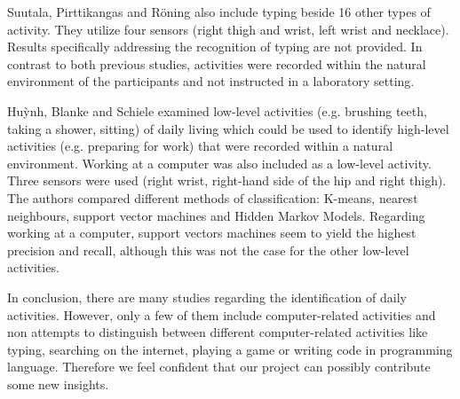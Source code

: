 \documentclass[11pt,a4paper]{paper}
\begin{document}
Suutala, Pirttikangas and Röning \cite{suutalaetal2007} also 
 include typing beside 16 other types of activity. 
They utilize four sensors (right thigh and wrist, left wrist and necklace).
Results specifically addressing the recognition of typing are not provided.
In contrast to both previous studies, activities were recorded within the
 natural environment of the participants and not instructed in a laboratory setting.
 
Hu\`{y}nh, Blanke and Schiele \cite{huynhetal2007} examined low-level activities (e.g. brushing teeth,
 taking a shower, sitting) of daily living which could be used to identify high-level activities (e.g. 
 preparing for work) that were recorded within a natural environment.
Working at a computer was also included as a low-level activity.
Three sensors were used (right wrist, right-hand side of the hip and right thigh).
The authors compared different methods of classification: K-means, nearest neighbours, support vector machines and
 Hidden Markov Models.
Regarding working at a computer, support vectors machines seem to yield the highest precision and recall, 
 although this was not the case for the other low-level activities.
 
In conclusion, there are many studies regarding the identification of daily activities.
However, only a few of them include computer-related activities and non attempts to distinguish
 between different computer-related activities like typing, searching on the internet, playing a game or
 writing code in programming language.
Therefore we feel confident that our project can possibly contribute some new insights.
 
 



\end{document}
